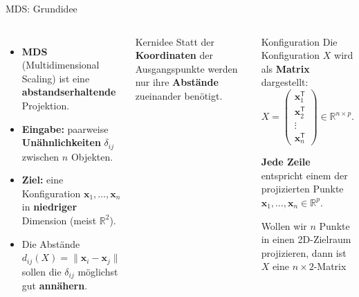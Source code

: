 \begin{frame}{MDS: Grundidee}
\footnotesize
\begin{columns}
\begin{itemize}
  \item \textbf{MDS} (Multidimensional Scaling) ist eine
        \textbf{abstandserhaltende} Projektion.
  \item \textbf{Eingabe:} paarweise \textbf{Unähnlichkeiten} $\delta_{ij}$
        zwischen $n$ Objekten.
  \item \textbf{Ziel:} eine Konfiguration $\mathbf{x}_1, \dots, \mathbf{x}_n$
        in \textbf{niedriger} Dimension (meist $\mathbb{R}^2$).
  \item Die Abstände $d_{ij}(X) = \lVert \mathbf{x}_i - \mathbf{x}_j \rVert$
        sollen die $\delta_{ij}$ möglichst gut \textbf{annähern}.
\end{itemize}

\begin{block}{\footnotesize Kernidee}
Statt der \textbf{Koordinaten} der Ausgangspunkte werden nur ihre
\textbf{Abstände} zueinander benötigt.
\end{block}

\begin{blockC2}{\footnotesize Konfiguration}
Die Konfiguration $X$ wird als \textbf{Matrix} dargestellt:
\[
X=
\begin{pmatrix}
\mathbf{x}_1^{\mathsf{T}}\\
\mathbf{x}_2^{\mathsf{T}}\\
\vdots\\
\mathbf{x}_n^{\mathsf{T}}
\end{pmatrix}
\in \mathbb{R}^{n\times p}.
\]

\medskip

\textbf{Jede Zeile} entspricht einem der projizierten Punkte $\mathbf{x}_1, \dots, \mathbf{x}_n \in \mathbb{R}^p$.

\medskip

Wollen wir $n$ Punkte in einen 2D-Zielraum projizieren, dann ist $X$ eine $n\times 2$-Matrix
\end{blockC2}


\end{columns}
\end{frame}

